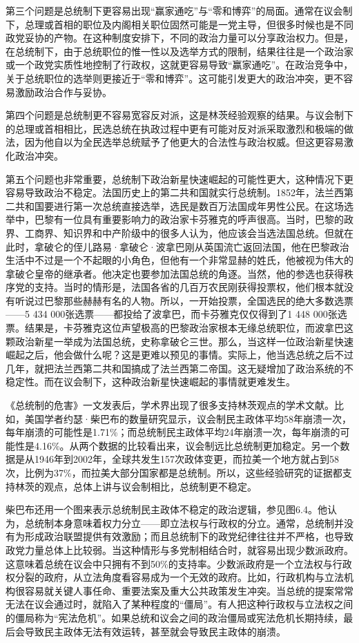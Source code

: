 第三个问题是总统制下更容易出现“赢家通吃”与“零和博弈”的局面。通常在议会制下，总理或首相的职位及内阁相关职位固然可能是一党主导，但很多时候也是不同政党妥协的产物。在这种制度安排下，不同的政治力量可以分享政治权力。但是，在总统制下，由于总统职位的惟一性以及选举方式的限制，结果往往是一个政治家或一个政党实质性地控制了行政权，这就更容易导致“赢家通吃”。在政治竞争中，关于总统职位的选举则更接近于“零和博弈”。这可能引发更大的政治冲突，更不容易激励政治合作与妥协。

第四个问题是总统制更不容易宽容反对派，这是林茨经验观察的结果。与议会制下的总理或首相相比，民选总统在执政过程中更有可能对反对派采取激烈和极端的做法，因为他自以为全民选举总统赋予了他更大的合法性与政治权威。但这更容易激化政治冲突。

第五个问题也非常重要，总统制下政治新星快速崛起的可能性更大，这种情况下更容易导致政治不稳定。法国历史上的第二共和国就实行总统制。1852年，法兰西第二共和国要进行第一次总统直接选举，选民是数百万法国成年男性公民。在这场选举中，巴黎有一位具有重要影响力的政治家卡芬雅克的呼声很高。当时，巴黎的政界、工商界、知识界和中产阶级中的很多人认为，他应该会当选法国总统。但就在此时，拿破仑的侄儿路易·拿破仑·波拿巴刚从英国流亡返回法国，他在巴黎政治生活中不过是一个不起眼的小角色，但他有一个非常显赫的姓氏，他被视为伟大的拿破仑皇帝的继承者。他决定也要参加法国总统的角逐。当然，他的参选也获得秩序党的支持。当时的情形是，法国各省的几百万农民刚获得投票权，他们根本就没有听说过巴黎那些赫赫有名的人物。所以，一开始投票，全国选民的绝大多数选票——5 434 000张选票——都投给了波拿巴，而卡芬雅克仅仅得到了1 448 000张选票。结果是，卡芬雅克这位声望极高的巴黎政治家根本无缘总统职位，而波拿巴这颗政治新星一举成为法国总统，史称拿破仑三世。那么，当这样一位政治新星快速崛起之后，他会做什么呢？这是更难以预见的事情。实际上，他当选总统之后不过几年，就把法兰西第二共和国搞成了法兰西第二帝国。这无疑增加了政治系统的不稳定性。而在议会制下，这种政治新星快速崛起的事情就更难发生。

《总统制的危害》一文发表后，学术界出现了很多支持林茨观点的学术文献。比如，美国学者约瑟·柴巴布的数量研究显示，议会制民主政体平均58年崩溃一次，每年崩溃的可能性是1.71\%；而总统制民主政体平均24年崩溃一次，每年崩溃的可能性是4.16\%。从两个数据的比较看出来，议会制远比总统制更加稳定。另一个数据是从1946年到2002年，全球共发生157次政体变更，而拉美一个地方就占到58次，比例为37\%，而拉美大部分国家都是总统制。所以，这些经验研究的证据都支持林茨的观点，总体上讲与议会制相比，总统制更不稳定。

柴巴布还用一个图来表示总统制民主政体不稳定的政治逻辑，参见图6.4。他认为，总统制本身意味着权力分立——即立法权与行政权的分立。通常，总统制并没有为形成政治联盟提供有效激励；而且总统制下的政党纪律往往并不严格，也导致政党力量总体上比较弱。当这种情形与多党制相结合时，就容易出现少数派政府。这意味着总统在议会中只拥有不到50\%的支持率。少数派政府是一个立法权与行政权分裂的政府，从立法角度看容易成为一个无效的政府。比如，行政机构与立法机构很容易就关键人事任命、重要法案及重大公共政策发生冲突。当总统的提案常常无法在议会通过时，就陷入了某种程度的“僵局”。有人把这种行政权与立法权之间的僵局称为“宪法危机”。如果总统和议会之间的政治僵局或宪法危机长期持续，最后会导致民主政体无法有效运转，甚至就会导致民主政体的崩溃。


